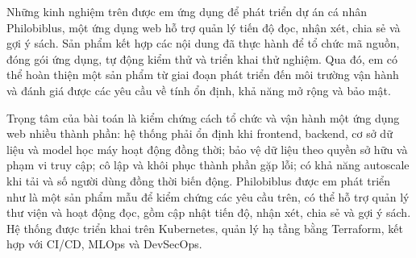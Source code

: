 Những kinh nghiệm trên được em ứng dụng để phát triển dự án cá nhân Philobiblus, một ứng dụng web hỗ trợ quản lý tiến độ đọc, nhận xét, chia sẻ và gợi ý sách. Sản phẩm kết hợp các nội dung đã thực hành để tổ chức mã nguồn, đóng gói ứng dụng, tự động kiểm thử và triển khai thử nghiệm. Qua đó, em có thể hoàn thiện một sản phẩm từ giai đoạn phát triển đến môi trường vận hành và đánh giá được các yêu cầu về tính ổn định, khả năng mở rộng và bảo mật.


Trọng tâm của bài toán là kiểm chứng cách tổ chức và vận hành một ứng dụng web nhiều thành phần: hệ thống phải ổn định khi frontend, backend, cơ sở dữ liệu và model học máy hoạt động đồng thời; bảo vệ dữ liệu theo quyền sở hữu và phạm vi truy cập; cô lập và khôi phục thành phần gặp lỗi; có khả năng autoscale khi tải và số người dùng đồng thời biến động. 
Philobiblus được em phát triển như là một sản phẩm mẫu để kiểm chứng các yêu cầu trên, có thể hỗ trợ quản lý thư viện và hoạt động đọc, gồm cập nhật tiến độ, nhận xét, chia sẻ và gợi ý sách. Hệ thống được triển khai trên Kubernetes, quản lý hạ tầng bằng Terraform, kết hợp với CI/CD, MLOps và DevSecOps.
